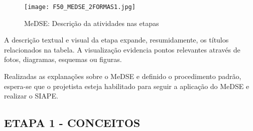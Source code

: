  \begin{figure}[h]
 	\centering
 	\texttt{[image: F50\_MEDSE\_2FORMAS1.jpg]} 
 	\caption{MeDSE: Descrição da atividades nas etapas}
 	\label{F50}
 \end{figure}


 A descrição textual e visual da etapa expande, resumidamente, os títulos relacionados na tabela. A visualização evidencia pontos relevantes através de fotos, diagramas, esquemas ou figuras. \par 


Realizadas as explanações sobre o MeDSE e definido o procedimento padrão, espera-se que o projetista esteja habilitado para seguir a aplicação do  MeDSE e realizar o SIAPE.
\cleardoublepage
\subsection{ETAPA 1 - CONCEITOS}

